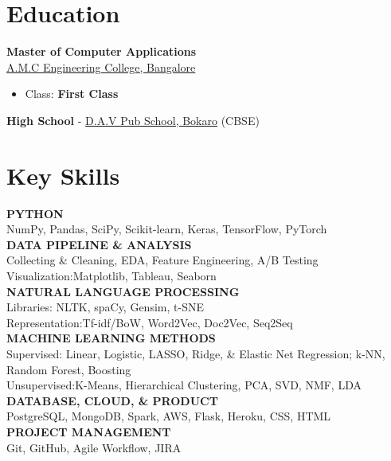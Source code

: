 \documentclass[margin, centered]{res}
\begin{document}
\begin{resume}

\section{Education}
\textbf{Master of Computer Applications}  \\
\href{}{A.M.C Engineering College, Bangalore}
\begin{itemize}
 \item Class:  \textbf{First Class} 
\end{itemize}
\textbf{High School} - \href{}{D.A.V Pub School, Bokaro} (CBSE) \\

 

\section{Key \hspace{-1mm} Skills}
\textbf{PYTHON}\\
NumPy, Pandas, SciPy, Scikit-learn, Keras, TensorFlow, PyTorch \\
\textbf{DATA PIPELINE \& ANALYSIS} \\
Collecting \& Cleaning, EDA, Feature Engineering, A/B Testing \\
Visualization:Matplotlib, Tableau, Seaborn\\
\textbf{NATURAL LANGUAGE PROCESSING} \\
Libraries: NLTK, spaCy, Gensim, t-SNE \\
Representation:Tf-idf/BoW, Word2Vec, Doc2Vec, Seq2Seq \\
\textbf{MACHINE LEARNING METHODS} \\
Supervised: Linear, Logistic, LASSO, Ridge, \& Elastic Net Regression; k-NN, Random Forest, Boosting  \\
Unsupervised:K-Means, Hierarchical Clustering, PCA, SVD, NMF, LDA \\
\textbf{DATABASE, CLOUD, \& PRODUCT} \\
PostgreSQL, MongoDB, Spark, AWS, Flask, Heroku, CSS, HTML \\
\textbf{PROJECT MANAGEMENT} \\
Git, GitHub, Agile Workflow, JIRA \\


\end{resume}
\end{document}
